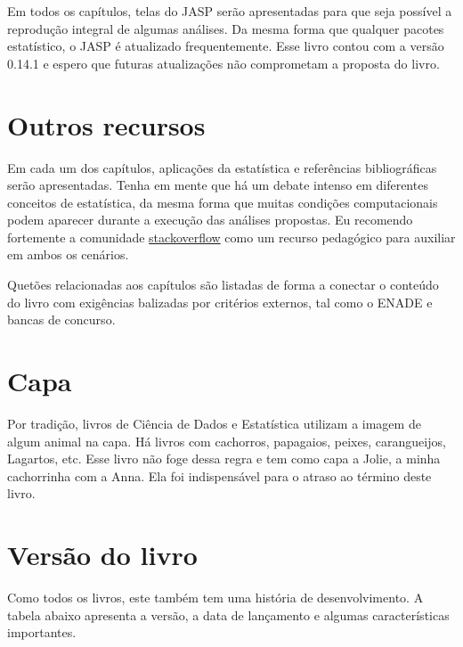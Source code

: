 \documentclass[
]{book}
\begin{document}
Em todos os capítulos, telas do JASP serão apresentadas para que seja possível a reprodução integral de algumas análises. Da mesma forma que qualquer pacotes estatístico, o JASP é atualizado frequentemente. Esse livro contou com a versão 0.14.1 e espero que futuras atualizações não comprometam a proposta do livro.

\hypertarget{outros-recursos}{%
\section{Outros recursos}\label{outros-recursos}}

Em cada um dos capítulos, aplicações da estatística e referências bibliográficas serão apresentadas. Tenha em mente que há um debate intenso em diferentes conceitos de estatística, da mesma forma que muitas condições computacionais podem aparecer durante a execução das análises propostas. Eu recomendo fortemente a comunidade \href{https://stackoverflow.com/}{stackoverflow} como um recurso pedagógico para auxiliar em ambos os cenários.

Quetões relacionadas aos capítulos são listadas de forma a conectar o conteúdo do livro com exigências balizadas por critérios externos, tal como o ENADE e bancas de concurso.

\hypertarget{capa}{%
\section{Capa}\label{capa}}

Por tradição, livros de Ciência de Dados e Estatística utilizam a imagem de algum animal na capa. Há livros com cachorros, papagaios, peixes, carangueijos, Lagartos, etc. Esse livro não foge dessa regra e tem como capa a Jolie, a minha cachorrinha com a Anna. Ela foi indispensável para o atraso ao término deste livro.

\hypertarget{versuxe3o-do-livro}{%
\section{Versão do livro}\label{versuxe3o-do-livro}}

Como todos os livros, este também tem uma história de desenvolvimento. A tabela abaixo apresenta a versão, a data de lançamento e algumas características importantes.
\end{document}
